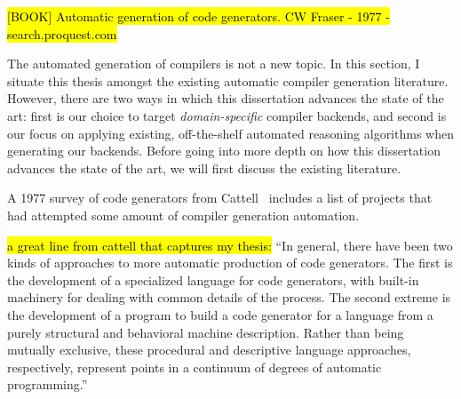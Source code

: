 \hl{[BOOK] Automatic generation of code generators. CW Fraser - 1977 - search.proquest.com}

The automated generation of compilers
  is not a new topic.
In this section, I situate this thesis
  amongst the existing 
  automatic compiler generation
  literature.
However, there are two ways
  in which this dissertation
  advances the state of the art:
  first is our choice
  to target \textit{domain-specific}
  compiler backends,
  and second is our focus on applying
  existing, off-the-shelf
  automated reasoning algorithms
  when generating our backends.
Before going into more depth
  on how this dissertation
  advances the state of the art,
  we will first discuss the existing
  literature.

A 1977 survey of code generators 
  from Cattell~\cite{cattell1977survey}
  includes a list of
  projects that had attempted
  some amount of compiler generation automation.

\hl{a great line from cattell that captures my thesis:}
``In general, there have been two kinds of approaches to more automatic production of
code generators. The first is the development of a specialized language for code
generators, with built-in machinery for dealing with common details of the process.
The second extreme is the development of a program to build a code generator for a
language from a purely structural and behavioral machine description. Rather than
being mutually exclusive, these procedural and descriptive language approaches,
respectively, represent points in a continuum of degrees of automatic programming.''
%

